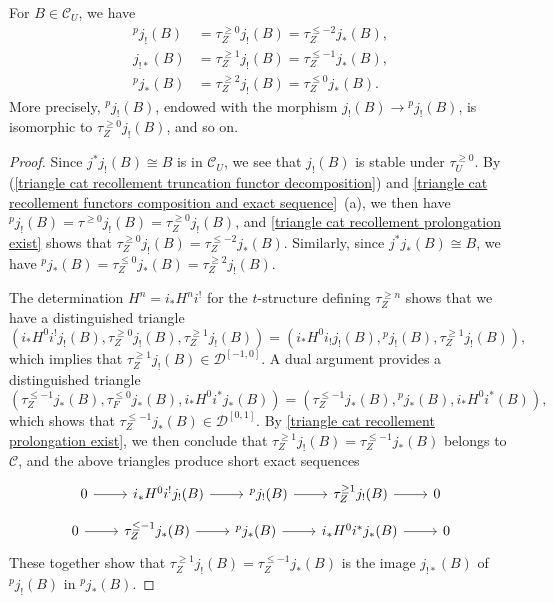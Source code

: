 \begin{proposition}\label{triangle cat recollement ^pj_! and ^pj_* is truncation}
For $B\in\mathcal{C}_U$, we have
\begin{align*}
{^pj_!}(B)&=\tau^{\geq 0}_Zj_!(B)=\tau^{\leq-2}_{Z}j_*(B),\\
j_{!*}(B)&=\tau^{\geq 1}_Zj_!(B)=\tau^{\leq-1}_Zj_*(B),\\
{^pj_*}(B)&=\tau^{\geq 2}_Zj_!(B)=\tau^{\leq 0}_Zj_*(B).
\end{align*}
More precisely, ${^pj_!}(B)$, endowed with the morphism $j_!(B)\to{^pj_!}(B)$, is isomorphic to $\tau^{\geq 0}_Zj_!(B)$, and so on.
\end{proposition}
\begin{proof}
Since $j^*j_!(B)\cong B$ is in $\mathcal{C}_U$, we see that $j_!(B)$ is stable under $\tau^{\geq 0}_U$. By (\ref{triangle cat recollement truncation functor decomposition}) and \cref{triangle cat recollement functors composition and exact sequence}~(a), we then have ${^pj_!}(B)=\tau^{\geq 0}j_!(B)=\tau^{\geq 0}_Zj_!(B)$, and \cref{triangle cat recollement prolongation exist} shows that $\tau^{\geq 0}_Zj_!(B)=\tau^{\leq -2}_Zj_*(B)$. Similarly, since $j^*j_*(B)\cong B$, we have ${^pj_*}(B)=\tau^{\leq 0}_Zj_*(B)=\tau^{\geq 2}_Zj_!(B)$.\par
The determination $H^n=i_*H^ni^!$ for the $t$-structure defining $\tau^{\geq n}_Z$ shows that we have a distinguished triangle
\[(i_*H^0i^!j_!(B),\tau^{\geq 0}_Zj_!(B),\tau^{\geq 1}_Zj_!(B))=(i_*H^0i_!j_!(B),{^pj_!}(B),\tau^{\geq 1}_Zj_!(B)),\]
which implies that $\tau_Z^{\geq 1}j_!(B)\in\mathcal{D}^{[-1,0]}$. A dual argument provides a distinguished triangle
\[(\tau^{\leq -1}_Zj_*(B),\tau^{\leq 0}_Fj_*(B),i_*H^0i^*j_*(B))=(\tau^{\leq -1}_Zj_*(B),{^pj_*}(B),i_*H^0i^*(B)),\]
which shows that $\tau^{\leq -1}_Zj_*(B)\in\mathcal{D}^{[0,1]}$. By \cref{triangle cat recollement prolongation exist}, we then conclude that $\tau^{\geq 1}_Zj_!(B)=\tau^{\leq -1}_Zj_*(B)$ belongs to $\mathcal{C}$, and the above triangles produce short exact sequences
\[\begin{tikzcd}
0\ar[r]&i_*H^0i^!j_!(B)\ar[r]&{^pj_!}(B)\ar[r]&\tau^{\geq 1}_Zj_!(B)\ar[r]&0
\end{tikzcd}\]
\vspace*{-4mm}
\[\begin{tikzcd}
0\ar[r]&\tau_Z^{\leq -1}j_*(B)\ar[r]&{^pj_*}(B)\ar[r]&i_*H^0i^*j_*(B)\ar[r]&0
\end{tikzcd}\]
These together show that $\tau^{\geq 1}_Zj_!(B)=\tau^{\leq -1}_Zj_*(B)$ is the image $j_{!*}(B)$ of ${^pj_!}(B)$ in ${^pj_*}(B)$.
\end{proof}


